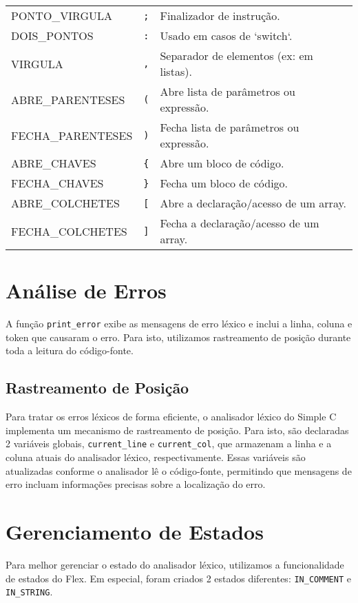 \documentclass[12pt,a4paper]{article}
\begin{document}
\begin{longtable}{lll}
\midrule
PONTO\_VIRGULA & \texttt{;} & Finalizador de instrução. \\
DOIS\_PONTOS & \texttt{:} & Usado em casos de `switch`. \\
VIRGULA & \texttt{,} & Separador de elementos (ex: em listas). \\
ABRE\_PARENTESES & \texttt{(} & Abre lista de parâmetros ou expressão. \\
FECHA\_PARENTESES & \texttt{)} & Fecha lista de parâmetros ou expressão. \\
ABRE\_CHAVES & \texttt{\{} & Abre um bloco de código. \\
FECHA\_CHAVES & \texttt{\}} & Fecha um bloco de código. \\
ABRE\_COLCHETES & \texttt{[} & Abre a declaração/acesso de um array. \\
FECHA\_COLCHETES & \texttt{]} & Fecha a declaração/acesso de um array. \\
\end{longtable}


\section{Análise de Erros}
\label{sec:err}

A função \texttt{print\_error} exibe as mensagens de erro léxico e inclui a linha, coluna e token que causaram o erro. Para isto, utilizamos rastreamento de posição durante toda a leitura do código-fonte.

\subsection{Rastreamento de Posição}

Para tratar os erros léxicos de forma eficiente, o analisador léxico do Simple C implementa um mecanismo de rastreamento de posição. Para isto, são declaradas 2 variáveis globais, \texttt{current\_line} e \texttt{current\_col}, que armazenam a linha e a coluna atuais do analisador léxico, respectivamente. Essas variáveis são atualizadas conforme o analisador lê o código-fonte, permitindo que mensagens de erro incluam informações precisas sobre a localização do erro.

\section{Gerenciamento de Estados}
\label{sec:estados}
Para melhor gerenciar o estado do analisador léxico, utilizamos a funcionalidade de estados do Flex. Em especial, foram criados 2 estados diferentes: \texttt{IN\_COMMENT} e \texttt{IN\_STRING}. 
\end{document}
